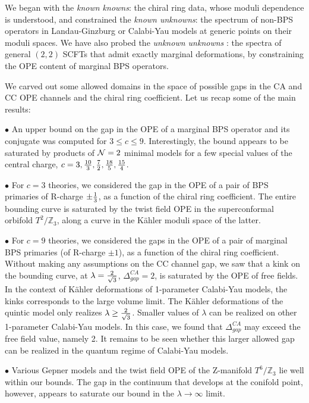 \documentclass[12pt]{article}
\begin{document}
We began with the {\it known knowns}: the chiral ring data, whose moduli dependence is understood, and constrained the {\it known unknowns}: the spectrum of non-BPS operators in Landau-Ginzburg or Calabi-Yau models at generic points on their moduli spaces. We have also probed the {\it unknown unknowns} \cite{Rumsfeld}: the spectra of general $(2,2)$ SCFTs that admit exactly marginal deformations, by constraining the OPE content of  marginal BPS operators. 

We carved out some allowed domains in the space of possible gaps in the CA and CC OPE channels and the chiral ring coefficient. Let us recap some of the main results:

\noindent $\bullet$ An upper bound on the gap in the OPE of a marginal BPS operator and its conjugate was computed for $3\leq c\leq 9$. Interestingly, the bound appears to be saturated by products of ${\cal N}=2$ minimal models for a few special values of the central charge, $c=3, {10\over 3}, {7\over 2}, {18\over 5}, {15\over 4}$.

\noindent $\bullet$ For $c=3$ theories, we considered the gap in the OPE of a pair of BPS primaries of R-charge $\pm {1\over 3}$, as a function of the chiral ring coefficient. The entire bounding curve is saturated by the twist field OPE in the superconformal orbifold $T^2/\mathbb{Z}_3$, along a curve in the K\"ahler moduli space of the latter.

\noindent $\bullet$ For $c=9$ theories, we considered the gaps in the OPE of a pair of marginal BPS primaries (of R-charge $\pm 1$), as a function of the chiral ring coefficient. Without making any assumptions on the CC channel gap, we saw that a kink on the bounding curve, at $\lambda = {2\over \sqrt{3}}$, $\Delta^{CA}_{gap}=2$, is saturated by the OPE of free fields. In the context of K\"ahler deformations of 1-parameter Calabi-Yau models, the kinks corresponds to the large volume limit. The K\"ahler deformations of the quintic model only realizes $\lambda\geq {2\over \sqrt{3}}$. Smaller values of $\lambda$ can be realized on other 1-parameter Calabi-Yau models. In this case, we found that $\Delta^{CA}_{gap}$ may exceed the free field value, namely 2. It remains to be seen whether this larger allowed gap can be realized in the quantum regime of Calabi-Yau models.

\noindent $\bullet$ Various Gepner models and the twist field OPE of the Z-manifold $T^6/\mathbb{Z}_3$ lie well within our bounds. The gap in the continuum that develops at the conifold point, however, appears to saturate our bound in the $\lambda\to \infty$ limit.
\end{document}
